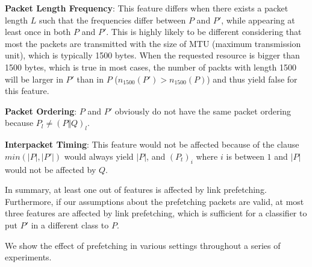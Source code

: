 {\bf Packet Length Frequency}:
This feature differs when there exists a packet length $L$ such that the frequencies differ between $P$ and $P'$, while appearing at least once in both $P$ and $P'$.
This is highly likely to be different considering that most the packets are transmitted with the size of MTU (maximum transmission unit), which is typically 1500 bytes.
When the requested resource is bigger than 1500 bytes, which is true in most cases, the number of packts with length 1500 will be larger in $P'$ than in $P$ ($n_{1500}(P') > n_{1500}(P)$) and thus yield false for this feature.

{\bf Packet Ordering}:
$P$ and $P'$ obviously do not have the same packet ordering because $P_l \neq (P \Vert Q)_l$.

{\bf Interpacket Timing}:
This feature would not be affected because of the clause $\mathit{min}(|P|,|P'|)$ would always yield $|P|$, and $(P_t)_i$ where $i$ is between $1$ and $|P|$ would not be affected by $Q$.

In summary, at least one out of features is affected by link prefetching.
Furthermore, if our assumptions about the prefetching packets are valid, at most three features are affected by link prefetching, which is sufficient for a classifier to put $P'$ in a different class to $P$.

We show the effect of prefetching in various settings throughout a series of experiments.

